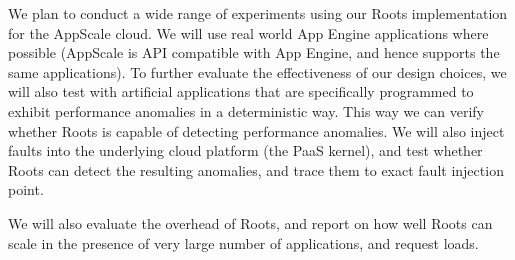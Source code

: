 We plan to conduct a wide range of experiments using our Roots implementation for the
AppScale cloud. We will use real world App Engine applications where possible (AppScale
is API compatible with App Engine, and hence supports the same applications). To
further evaluate the effectiveness of our design choices, we will also test with
artificial applications that are specifically programmed to exhibit performance
anomalies in a deterministic way. This way we can verify whether Roots is
capable of detecting performance anomalies.
We will also inject faults into the underlying cloud platform (the PaaS kernel),
and test whether Roots can detect the resulting anomalies, and trace them to
exact fault injection point.

We will also evaluate the overhead of Roots, and report on how well Roots can
scale in the presence of very large number of applications, and request loads.
